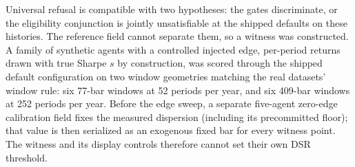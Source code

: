 Universal refusal is compatible with two hypotheses: the gates discriminate, or the eligibility conjunction is jointly unsatisfiable at the shipped defaults on these histories. The reference field cannot separate them, so a witness was constructed. A family of synthetic agents with a controlled injected edge, per-period returns drawn with true Sharpe $s$ by construction, was scored through the shipped default configuration on two window geometries matching the real datasets' window rule: six 77-bar windows at 52 periods per year, and six 409-bar windows at 252 periods per year. Before the edge sweep, a separate five-agent zero-edge calibration field fixes the measured dispersion (including its precommitted floor); that value is then serialized as an exogenous fixed bar for every witness point. The witness and its display controls therefore cannot set their own DSR threshold.

